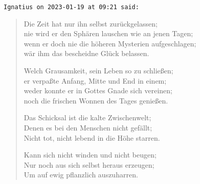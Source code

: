 \begin{footnotesize}
\begin{sffamily}
\texttt{Ignatius on 2023-01-19 at 09:21 said:}

\begin{verse}
Die Zeit hat nur ihn selbst zurückgelassen;\\ nie wird er den Sphären lauschen wie an jenen Tagen;\\ wenn er doch nie die höheren Mysterien aufgeschlagen;\\ wär ihm das bescheidne Glück belassen.

Welch Grausamkeit, sein Leben so zu schließen;\\ er verpaßte Anfang, Mitte und End in einem;\\ weder konnte er in Gottes Gnade sich vereinen;\\ noch die frischen Wonnen des Tages genießen.

Das Schicksal ist die kalte Zwischenwelt;\\ Denen es bei den Menschen nicht gefällt;\\ Nicht tot, nicht lebend in die Höhe starren.

Kann sich nicht winden und nicht beugen;\\ Nur noch aus sich selbst heraus erzeugen;\\ Um auf ewig pflanzlich auszuharren.
\end{verse}

\hfill

\end{sffamily}
\end{footnotesize}

